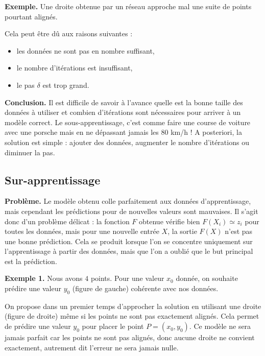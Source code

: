 \bigskip
\textbf{Exemple.} Une droite obtenue par un réseau approche mal une suite de points pourtant alignés.

Cela peut être dû aux raisons suivantes :
\begin{itemize}
	\item les données ne sont pas en nombre suffisant, 
	\item le nombre d'itérations est insuffisant,
	\item le pas $\delta$ est trop grand.
\end{itemize}

\bigskip

\textbf{Conclusion.} 
Il est difficile de savoir à l'avance quelle est la bonne taille
des données à utiliser et combien d'itérations sont nécessaires pour arriver à un modèle correct. Le sous-apprentissage, c'est comme faire une course de voiture avec une porsche mais en ne dépassant jamais les 80 km/h !
A posteriori, la solution est simple : ajouter des données, augmenter le nombre d'itérations ou diminuer la pas.


\subsection{Sur-apprentissage}


\textbf{Problème.} Le modèle obtenu \og{}colle\fg{} parfaitement aux données d'apprentissage, mais cependant les prédictions pour de nouvelles valeurs sont mauvaises.
Il s'agit donc d'un problème délicat : la fonction $F$ obtenue vérifie bien $F(X_i) \simeq z_i$ pour toutes les données, mais pour une nouvelle entrée $X$, la sortie $F(X)$ n'est pas une bonne prédiction. Cela se produit lorsque l'on se concentre uniquement sur l'apprentissage à partir des données, mais que l'on a oublié que le but principal est la prédiction.

\bigskip


\textbf{Exemple 1.} Nous avons $4$ points.
Pour une valeur $x_0$ donnée, on souhaite prédire une valeur $y_0$ (figure de gauche) cohérente avec nos données.

On propose dans un premier temps d'approcher la solution en utilisant une droite (figure de droite) même si les points ne sont pas exactement alignés. Cela permet de prédire une valeur $y_0$ pour placer le point $P=(x_0,y_0)$.
Ce modèle ne sera jamais parfait car les points ne sont pas alignés, donc aucune droite ne convient exactement, autrement dit l'erreur ne sera jamais nulle.

